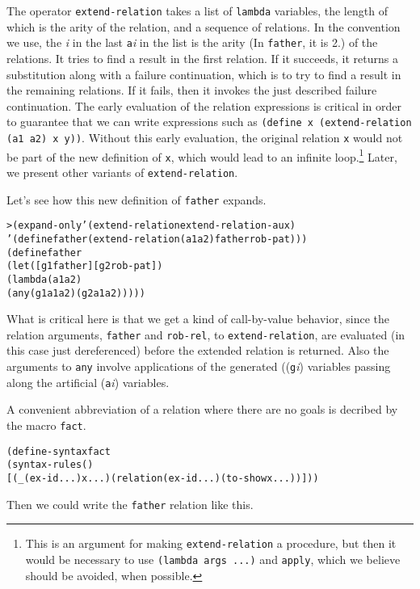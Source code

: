 The operator \texttt{extend-relation} takes a list of \texttt{lambda}
variables, the length of which is the arity of the relation, and a
sequence of relations. In the convention we use, the \emph{i} in the
last \texttt{a}\emph{i} in the list is the arity (In \texttt{father},
it is 2.) of the relations.  It tries to find a result in the first
relation. If it succeeds, it returns a substitution along with a
failure continuation, which is to try to find a result in the
remaining relations.  If it fails, then it invokes the just described
failure continuation.  The early evaluation of the relation
expressions is critical in order to guarantee that we can write
expressions such as \texttt{(define x (extend-relation (a1 a2) x y))}.
Without this early evaluation, the original relation \texttt{x} would
not be part of the new definition of \texttt{x}, which would lead to
an infinite loop.\footnote{This is an argument for making
\texttt{extend-relation} a procedure, but then it would be necessary
to use \texttt{(lambda args ...)} and \texttt{apply}, which we believe
should be avoided, when possible.}  Later, we present other variants of
\texttt{extend-relation}.

Let's see how this new definition of \texttt{father} expands.

\begin{alltt}
> (expand-only '(extend-relation extend-relation-aux)
    '(define father (extend-relation (a1 a2) father rob-pat)))
(define father
  (let ([g1 father] [g2 rob-pat])
    (lambda (a1 a2)
      (any (g1 a1 a2) (g2 a1 a2)))))
\end{alltt}
\noindent
What is critical here is that we get a kind of call-by-value behavior,
since the relation arguments, \texttt{father} and \texttt{rob-rel}, to
\texttt{extend-relation}, are evaluated (in this case just
dereferenced) before the extended relation is returned.  Also the
arguments to \texttt{any} involve applications of the generated
((\texttt{g}\emph{i}) variables passing along the artificial
(\texttt{a}\emph{i}) variables.

A convenient abbreviation of a relation where there are no goals
is decribed by the macro \texttt{fact}.

\begin{alltt}
(define-syntax fact
  (syntax-rules ()
    [(_ (ex-id ...) x ...) (relation (ex-id ...) (to-show x ...))]))
\end{alltt}

Then we could write the \texttt{father} relation like this.

